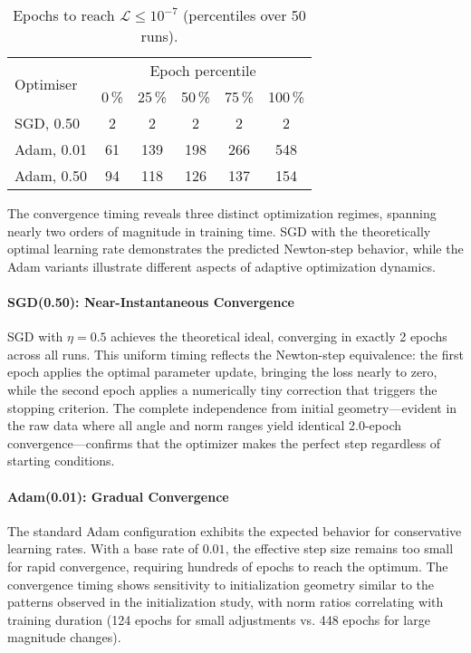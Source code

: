 \begin{table}[ht]
\centering
\caption{Epochs to reach $\mathcal{L}\le10^{-7}$ (percentiles over 50 runs).}
\label{tab:abs1-opt-conv}
\begin{tabular}{lccccc}
\toprule
\multirow{2}{*}{Optimiser} &
\multicolumn{5}{c}{Epoch percentile} \\
\cmidrule(lr){2-6}
& 0\,\% & 25\,\% & 50\,\% & 75\,\% & 100\,\% \\
\midrule
SGD,  0.50 & 2   & 2   & 2   & 2   & 2   \\ 
Adam, 0.01 & 61  & 139 & 198 & 266 & 548 \\
Adam, 0.50 & 94  & 118 & 126 & 137 & 154 \\
\bottomrule
\end{tabular}
\end{table}

The convergence timing reveals three distinct optimization regimes, spanning nearly two orders of magnitude in training time. SGD with the theoretically optimal learning rate demonstrates the predicted Newton-step behavior, while the Adam variants illustrate different aspects of adaptive optimization dynamics.

\paragraph{SGD(0.50): Near-Instantaneous Convergence}
SGD with $\eta=0.5$ achieves the theoretical ideal, converging in exactly 2 epochs across all runs. This uniform timing reflects the Newton-step equivalence: the first epoch applies the optimal parameter update, bringing the loss nearly to zero, while the second epoch applies a numerically tiny correction that triggers the stopping criterion. The complete independence from initial geometry—evident in the raw data where all angle and norm ranges yield identical 2.0-epoch convergence—confirms that the optimizer makes the perfect step regardless of starting conditions.

\paragraph{Adam(0.01): Gradual Convergence}
The standard Adam configuration exhibits the expected behavior for conservative learning rates. With a base rate of $0.01$, the effective step size remains too small for rapid convergence, requiring hundreds of epochs to reach the optimum. The convergence timing shows sensitivity to initialization geometry similar to the patterns observed in the initialization study, with norm ratios correlating with training duration (124 epochs for small adjustments vs. 448 epochs for large magnitude changes).

